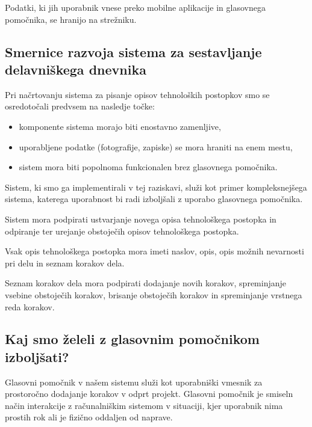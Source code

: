 \documentclass[a4paper, 12pt]{book}
\begin{document}
Podatki, ki jih uporabnik vnese preko mobilne aplikacije in glasovnega pomočnika, se hranijo na strežniku.



\subsection{Smernice razvoja sistema za sestavljanje delavniškega dnevnika}

Pri načrtovanju sistema za pisanje opisov tehnoloških postopkov smo se osredotočali predvsem na nasledje točke:
\begin{itemize}
	\item komponente sistema morajo biti enostavno zamenljive,
	\item uporabljene podatke (fotografije, zapiske) se mora hraniti na enem mestu,
	\item sistem mora biti popolnoma funkcionalen brez glasovnega pomočnika.
\end{itemize}

Sistem, ki smo ga implementirali v tej raziskavi, služi kot primer kompleksnejšega sistema, katerega uporabnost bi radi izboljšali z uporabo glasovnega pomočnika.

Sistem mora podpirati ustvarjanje novega opisa tehnološkega postopka in odpiranje ter urejanje obstoječih opisov tehnološkega postopka.

Vsak opis tehnološkega postopka mora imeti naslov, opis, opis možnih nevarnosti pri delu in seznam korakov dela.

Seznam korakov dela mora podpirati dodajanje novih korakov, spreminjanje vsebine obstoječih korakov, brisanje obstoječih korakov in spreminjanje vrstnega reda korakov.

\subsection{Kaj smo želeli z glasovnim pomočnikom izboljšati?}

Glasovni pomočnik v našem sistemu služi kot uporabniški vmesnik za prostoročno dodajanje korakov v odprt projekt.
Glasovni pomočnik je smiseln način interakcije z računalniškim sistemom v situaciji, kjer uporabnik nima prostih rok ali je fizično oddaljen od naprave.
\end{document}
